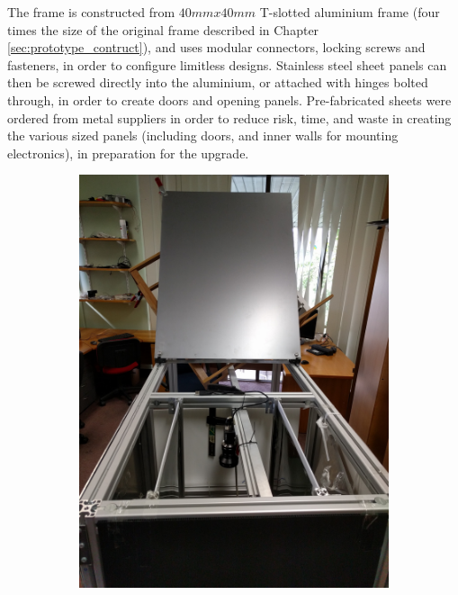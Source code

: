 \documentclass[fleqn,twoside,12pt]{report}
\begin{document}
The frame is constructed from $40mmx40mm$ T-slotted aluminium frame (four times the size of the original frame described in Chapter \ref{sec:prototype_contruct}), and uses modular connectors, locking screws and fasteners, in order to configure limitless designs. Stainless steel sheet panels can then be screwed directly into the aluminium, or attached with hinges bolted through, in order to create doors and opening panels. Pre-fabricated sheets were ordered from metal suppliers in order to reduce risk, time, and waste in creating the various sized panels (including doors, and inner walls for mounting electronics), in preparation for the upgrade.


\begin{figure}[h]
	\centering
	\begin{subfigure}{.5\textwidth}
		\centering
		\includegraphics[width=.9\linewidth]{system_v2_construct_1.jpg}
		\caption{}
		\label{fig:system_v2_construct_1}
	\end{subfigure}%
	\begin{subfigure}{.5\textwidth}
		\centering

\end{subfigure}
\end{figure}
\end{document}
